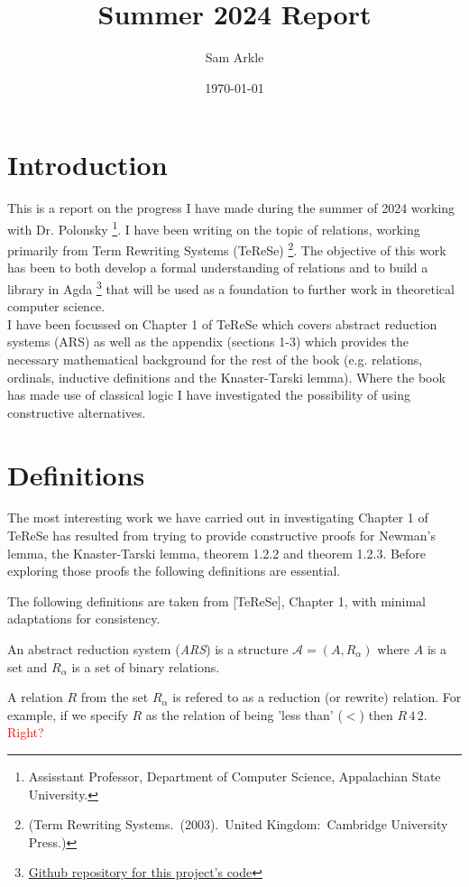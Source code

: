 \documentclass{scrartcl}
\title{Summer 2024 Report}
\author{Sam Arkle}
\date{\today}
\begin{document}
\renewcommand{\arraystretch}{1.3}

\maketitle

\tableofcontents

\section{Introduction}
This is a report on the progress I have made during the summer of 2024 working with Dr. Polonsky \footnote{Assisstant Professor, Department of Computer Science, Appalachian State University.}. I have been writing on the topic of relations, working primarily from Term Rewriting Systems (TeReSe) \footnote{(Term Rewriting Systems. (2003). United Kingdom: Cambridge University Press.)}.
The objective of this work has been to both develop a formal understanding of relations and to build a library in Agda \footnote{\href{https://github.com/DrPolonsky/LAM/tree/main/Relations}{Github repository for this project's code}} that will be used as a foundation to further work in theoretical computer science.
\\
I have been focussed on Chapter 1 of TeReSe which covers abstract reduction systems (ARS) as well as the appendix (sections 1-3) which provides the necessary mathematical background for the rest of the book (e.g. relations, ordinals, inductive definitions and the Knaster-Tarski lemma). Where the book has made use of classical logic I have investigated the possibility of using constructive alternatives.

\section{Definitions} \label{section:Definitions}
The most interesting work we have carried out in investigating Chapter 1 of TeReSe has resulted from trying to provide constructive proofs for Newman's lemma, the Knaster-Tarski lemma, theorem 1.2.2 and theorem 1.2.3. Before exploring those proofs the following definitions are essential.


The following definitions are taken from [TeReSe], Chapter 1,
with minimal adaptations for consistency.

\begin{dfn}
  An abstract reduction system (\emph{ARS}) is a structure $\mathcal{A} = (A, R_\alpha)$ where $A$ is a set and $R_\alpha$ is a set of binary relations.
\end{dfn}
A relation $R$ from the set $R_\alpha$ is refered to as a reduction (or rewrite) relation. For example, if we specify $R$ as the relation of being 'less than' ($<$) then $R\, 4\, 2$. \textcolor{red}{Right?}
\end{document}
